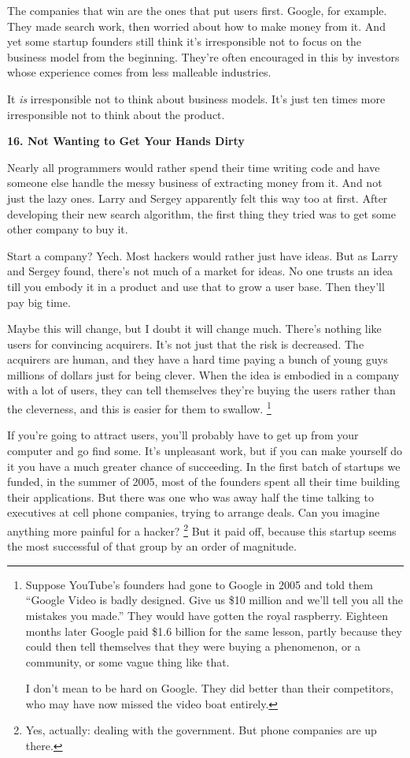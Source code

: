 \documentclass[12pt]{book}
\begin{document}
The companies that win are the ones that put users first. Google, for
example. They made search work, then worried about how to make money
from it. And yet some startup founders still think it's irresponsible
not to focus on the business model from the beginning. They're often
encouraged in this by investors whose experience comes from less
malleable industries.

It \emph{is} irresponsible not to think about business models. It's just
ten times more irresponsible not to think about the product.

\textbf{16. Not Wanting to Get Your Hands Dirty}

Nearly all programmers would rather spend their time writing code and
have someone else handle the messy business of extracting money from it.
And not just the lazy ones. Larry and Sergey apparently felt this way
too at first. After developing their new search algorithm, the first
thing they tried was to get some other company to buy it.

Start a company? Yech. Most hackers would rather just have ideas. But as
Larry and Sergey found, there's not much of a market for ideas. No one
trusts an idea till you embody it in a product and use that to grow a
user base. Then they'll pay big time.

Maybe this will change, but I doubt it will change much. There's nothing
like users for convincing acquirers. It's not just that the risk is
decreased. The acquirers are human, and they have a hard time paying a
bunch of young guys millions of dollars just for being clever. When the
idea is embodied in a company with a lot of users, they can tell
themselves they're buying the users rather than the cleverness, and this
is easier for them to swallow. \footnote{Suppose YouTube's founders had gone to Google in 2005 and told
them ``Google Video is badly designed. Give us \$10 million and we'll
tell you all the mistakes you made.'' They would have gotten the royal
raspberry. Eighteen months later Google paid \$1.6 billion for the same
lesson, partly because they could then tell themselves that they were
buying a phenomenon, or a community, or some vague thing like that.

I don't mean to be hard on Google. They did better than their
competitors, who may have now missed the video boat entirely.}

If you're going to attract users, you'll probably have to get up from
your computer and go find some. It's unpleasant work, but if you can
make yourself do it you have a much greater chance of succeeding. In the
first batch of startups we funded, in the summer of 2005, most of the
founders spent all their time building their applications. But there was
one who was away half the time talking to executives at cell phone
companies, trying to arrange deals. Can you imagine anything more
painful for a hacker? \footnote{Yes, actually: dealing with the government. But phone companies
are up there.} But it paid off, because
this startup seems the most successful of that group by an order of
magnitude.
\end{document}
